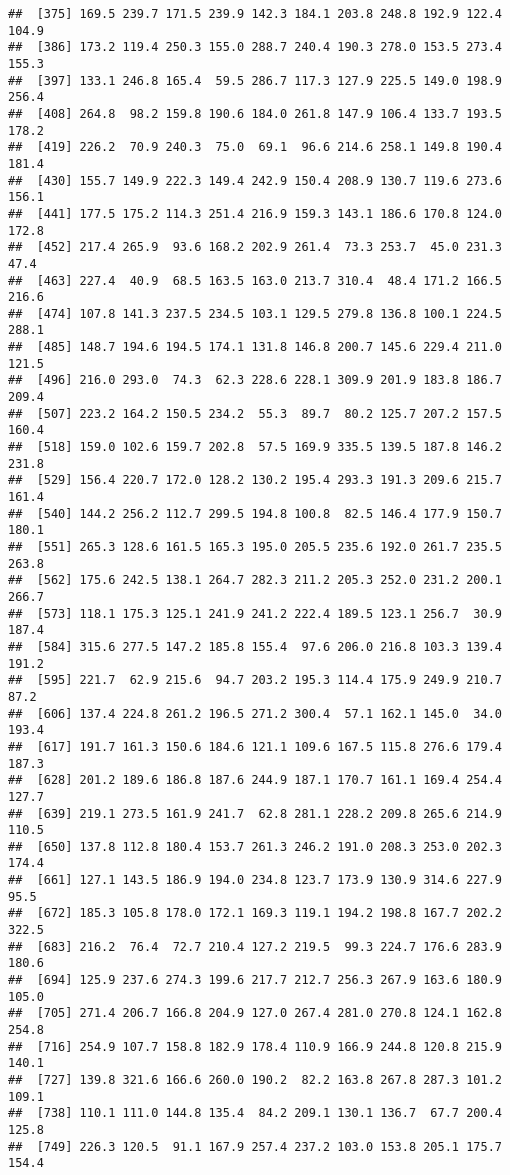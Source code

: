 \documentclass[]{article}
\begin{document}
\begin{verbatim}
##  [375] 169.5 239.7 171.5 239.9 142.3 184.1 203.8 248.8 192.9 122.4 104.9
##  [386] 173.2 119.4 250.3 155.0 288.7 240.4 190.3 278.0 153.5 273.4 155.3
##  [397] 133.1 246.8 165.4  59.5 286.7 117.3 127.9 225.5 149.0 198.9 256.4
##  [408] 264.8  98.2 159.8 190.6 184.0 261.8 147.9 106.4 133.7 193.5 178.2
##  [419] 226.2  70.9 240.3  75.0  69.1  96.6 214.6 258.1 149.8 190.4 181.4
##  [430] 155.7 149.9 222.3 149.4 242.9 150.4 208.9 130.7 119.6 273.6 156.1
##  [441] 177.5 175.2 114.3 251.4 216.9 159.3 143.1 186.6 170.8 124.0 172.8
##  [452] 217.4 265.9  93.6 168.2 202.9 261.4  73.3 253.7  45.0 231.3  47.4
##  [463] 227.4  40.9  68.5 163.5 163.0 213.7 310.4  48.4 171.2 166.5 216.6
##  [474] 107.8 141.3 237.5 234.5 103.1 129.5 279.8 136.8 100.1 224.5 288.1
##  [485] 148.7 194.6 194.5 174.1 131.8 146.8 200.7 145.6 229.4 211.0 121.5
##  [496] 216.0 293.0  74.3  62.3 228.6 228.1 309.9 201.9 183.8 186.7 209.4
##  [507] 223.2 164.2 150.5 234.2  55.3  89.7  80.2 125.7 207.2 157.5 160.4
##  [518] 159.0 102.6 159.7 202.8  57.5 169.9 335.5 139.5 187.8 146.2 231.8
##  [529] 156.4 220.7 172.0 128.2 130.2 195.4 293.3 191.3 209.6 215.7 161.4
##  [540] 144.2 256.2 112.7 299.5 194.8 100.8  82.5 146.4 177.9 150.7 180.1
##  [551] 265.3 128.6 161.5 165.3 195.0 205.5 235.6 192.0 261.7 235.5 263.8
##  [562] 175.6 242.5 138.1 264.7 282.3 211.2 205.3 252.0 231.2 200.1 266.7
##  [573] 118.1 175.3 125.1 241.9 241.2 222.4 189.5 123.1 256.7  30.9 187.4
##  [584] 315.6 277.5 147.2 185.8 155.4  97.6 206.0 216.8 103.3 139.4 191.2
##  [595] 221.7  62.9 215.6  94.7 203.2 195.3 114.4 175.9 249.9 210.7  87.2
##  [606] 137.4 224.8 261.2 196.5 271.2 300.4  57.1 162.1 145.0  34.0 193.4
##  [617] 191.7 161.3 150.6 184.6 121.1 109.6 167.5 115.8 276.6 179.4 187.3
##  [628] 201.2 189.6 186.8 187.6 244.9 187.1 170.7 161.1 169.4 254.4 127.7
##  [639] 219.1 273.5 161.9 241.7  62.8 281.1 228.2 209.8 265.6 214.9 110.5
##  [650] 137.8 112.8 180.4 153.7 261.3 246.2 191.0 208.3 253.0 202.3 174.4
##  [661] 127.1 143.5 186.9 194.0 234.8 123.7 173.9 130.9 314.6 227.9  95.5
##  [672] 185.3 105.8 178.0 172.1 169.3 119.1 194.2 198.8 167.7 202.2 322.5
##  [683] 216.2  76.4  72.7 210.4 127.2 219.5  99.3 224.7 176.6 283.9 180.6
##  [694] 125.9 237.6 274.3 199.6 217.7 212.7 256.3 267.9 163.6 180.9 105.0
##  [705] 271.4 206.7 166.8 204.9 127.0 267.4 281.0 270.8 124.1 162.8 254.8
##  [716] 254.9 107.7 158.8 182.9 178.4 110.9 166.9 244.8 120.8 215.9 140.1
##  [727] 139.8 321.6 166.6 260.0 190.2  82.2 163.8 267.8 287.3 101.2 109.1
##  [738] 110.1 111.0 144.8 135.4  84.2 209.1 130.1 136.7  67.7 200.4 125.8
##  [749] 226.3 120.5  91.1 167.9 257.4 237.2 103.0 153.8 205.1 175.7 154.4

\end{verbatim}
\end{document}
